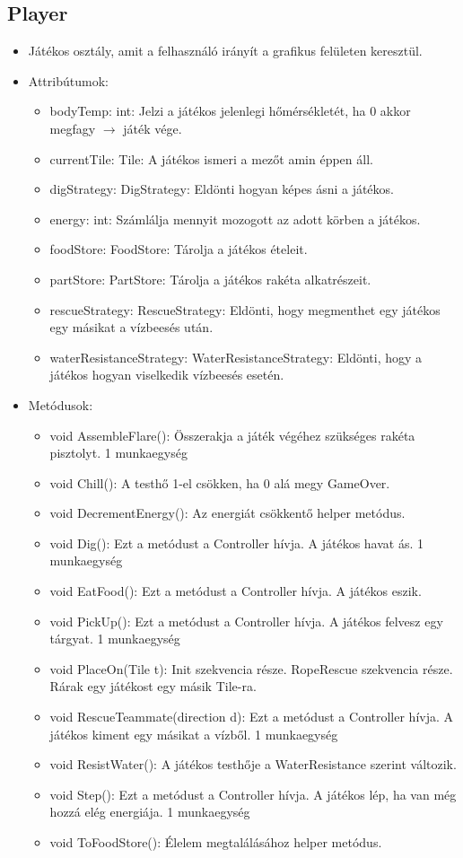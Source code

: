\subsection{Player}
\begin{itemize}
	\item Játékos osztály, amit a felhasználó irányít a grafikus felületen keresztül.

\item Attribútumok:
\begin{itemize}
	\item bodyTemp: int: Jelzi a játékos jelenlegi hőmérsékletét, ha 0 akkor megfagy $\rightarrow$ játék vége.
	\item currentTile: Tile: A játékos ismeri a mezőt amin éppen áll.
	\item digStrategy: DigStrategy: Eldönti hogyan képes ásni a játékos.
	\item energy: int: Számlálja mennyit mozogott az adott körben a játékos.
	\item foodStore: FoodStore: Tárolja a játékos ételeit.
	\item partStore: PartStore: Tárolja a játékos rakéta alkatrészeit.
	\item rescueStrategy: RescueStrategy: Eldönti, hogy megmenthet egy játékos egy másikat a vízbeesés után.
	\item waterResistanceStrategy: WaterResistanceStrategy: Eldönti, hogy a játékos hogyan viselkedik vízbeesés esetén.
\end{itemize}
\item Metódusok:
\begin{itemize}
	\item void AssembleFlare(): Összerakja a játék végéhez szükséges rakéta pisztolyt. 1 munkaegység
	\item void Chill(): A testhő 1-el csökken, ha 0 alá megy GameOver.
	\item void DecrementEnergy(): Az energiát csökkentő helper metódus.
	\item void Dig(): Ezt a metódust a Controller hívja. A játékos havat ás. 1 munkaegység
	\item void EatFood(): Ezt a metódust a Controller hívja. A játékos eszik.
	\item void PickUp(): Ezt a metódust a Controller hívja. A játékos felvesz egy tárgyat. 1 munkaegység
	\item void PlaceOn(Tile t): Init szekvencia része. RopeRescue szekvencia része. Rárak egy játékost egy másik Tile-ra.
	\item void RescueTeammate(direction d): Ezt a metódust a Controller hívja. A játékos kiment egy másikat a vízből. 1 munkaegység
	\item void ResistWater(): A játékos testhője a WaterResistance szerint változik.
	\item void Step(): Ezt a metódust a Controller hívja. A játékos lép, ha van még hozzá elég energiája. 1 munkaegység
	\item void ToFoodStore(): Élelem megtalálásához helper metódus.
\end{itemize}
\end{itemize}


